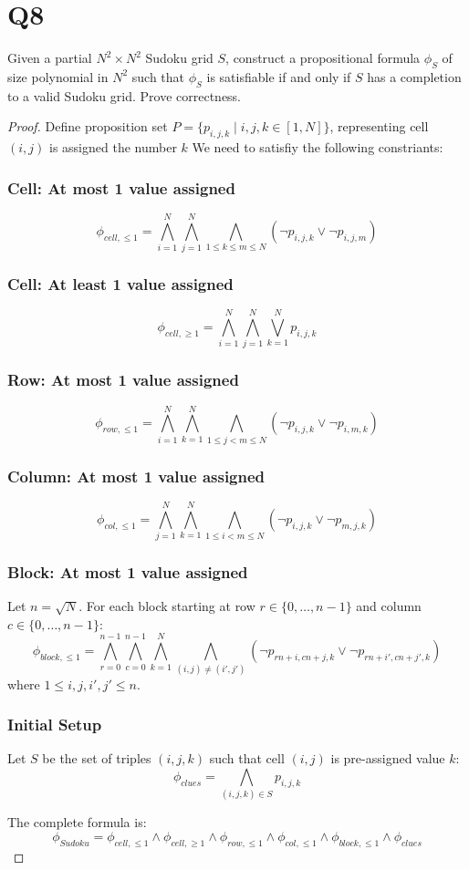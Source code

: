 \documentclass{article}
\begin{document}
\section*{Q8}
Given a partial $N^2\times N^2$ Sudoku grid $S$, construct a propositional formula $\phi_S$
of size polynomial in $N^2$ such that $\phi_S$ is satisfiable if and only if
$S$ has a completion to a valid Sudoku grid. Prove correctness.
\begin{proof}
    Define proposition set $P = \{p_{i, j, k} \mid i, j, k \in [1, N]\}$, representing cell $(i, j)$ is assigned the number $k$
    We need to satisfiy the following constriants:
    \subsubsection*{Cell: At most 1 value assigned}
    \[\phi_{cell, \leq 1} = \bigwedge_{i=1}^N \bigwedge_{j=1}^N \bigwedge_{1\leq k\leq m\leq N} (\neg p_{i,j,k} \lor \neg p_{i,j,m})\]
    \subsubsection*{Cell: At least 1 value assigned}
    \[\phi_{cell, \geq 1} = \bigwedge_{i=1}^N \bigwedge_{j=1}^N \bigvee_{k=1}^N p_{i,j,k}\]
    \subsubsection*{Row: At most 1 value assigned}
    \[\phi_{row, \leq 1} = \bigwedge_{i=1}^N \bigwedge_{k=1}^N \bigwedge_{1\leq j < m \leq N} (\neg p_{i,j,k} \lor \neg p_{i,m,k})\]
    \subsubsection*{Column: At most 1 value assigned}
    \[\phi_{col, \leq 1} = \bigwedge_{j=1}^N \bigwedge_{k=1}^N \bigwedge_{1\leq i < m \leq N} (\neg p_{i,j,k} \lor \neg p_{m,j,k})\]
    \subsubsection*{Block: At most 1 value assigned}
    Let $n = \sqrt{N}$. For each block starting at row $r \in \{0, \dots, n-1\}$ and column $c \in \{0, \dots, n-1\}$:
    \[\phi_{block, \leq 1} = \bigwedge_{r=0}^{n-1} \bigwedge_{c=0}^{n-1} \bigwedge_{k=1}^N \bigwedge_{(i,j) \neq (i',j')} (\neg p_{rn+i, cn+j, k} \lor \neg p_{rn+i', cn+j', k})\]
    where $1 \leq i, j, i', j' \leq n$.
    
    \subsubsection*{Initial Setup}
    Let $S$ be the set of triples $(i, j, k)$ such that cell $(i, j)$ is pre-assigned value $k$:
    \[\phi_{clues} = \bigwedge_{(i,j,k) \in S} p_{i,j,k}\]

    The complete formula is:
    \[\phi_{Sudoku} = \phi_{cell, \leq 1} \land \phi_{cell, \geq 1} \land \phi_{row, \leq 1} \land \phi_{col, \leq 1} \land \phi_{block, \leq 1} \land \phi_{clues}\]
\end{proof}
\end{document}
